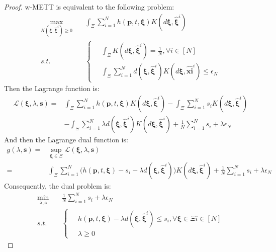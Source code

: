 \documentclass{article}
\begin{document}
\begin{proof}
	w-METT is equivalent to the following problem:
	\begin{align}
		\max_{K(\bm{\xi}, \hat{\bm{\xi}}^i) \geq 0 } \quad & \int_{\Xi} \sum_{i=1}^{N} h(\bm{p}, t, \bm{\xi}) K(d\bm{\xi}, \hat{\bm{\xi}}^i) \label{drsp-obj}\\
		s.t. \quad & \left\{
		\begin{aligned}
			\ & \int_{\Xi} K(d\bm{\xi}, \hat{\bm{\xi}}^i) = \frac{1}{N}, \forall i \in [N] \\
			& \int_{\Xi} \sum_{i=1}^{N} d(\bm{\xi}, \hat{\bm{\xi}}^i) K(d\bm{\xi}, \hat{\bm{xi}}^i) \leq \epsilon_N
		\end{aligned} \right. \label{drsp-cons}
	\end{align}
	Then the Lagrange function is:
	\begin{align}
		\mathcal{L} (\bm{\xi}, \lambda, \bm{s}) = & \int_{\Xi} \sum_{i=1}^{N} h(\bm{p}, t, \bm{\xi}) K(d\bm{\xi}, \hat{\bm{\xi}}^i)  - \int_{\Xi} \sum_{i=1}^{N} s_i K(d\bm{\xi}, \hat{\bm{\xi}}^i) \\
		& - \int_{\Xi} \sum_{i=1}^{N} \lambda d(\bm{\xi}, \hat{\bm{\xi}}^i) K(d\bm{\xi}, \hat{\bm{\xi}}^i) + \frac{1}{N} \sum_{i=1}^{N} s_i + \lambda \epsilon_N
	\end{align}
	And then the Lagrange dual function is:
	\begin{align}
		g(\lambda, \bm{s})  = & \sup_{\bm{\xi} \in \Xi} \mathcal{L}(\bm{\xi}, \lambda, \bm{s}) \\
		 = & \int_{\Xi} \sum_{i=1}^{N} \Big ( h(\bm{p}, t, \bm{\xi}) - s_i - \lambda d(\bm{\xi}, \hat{\bm{\xi}}^i) \Big ) K(d\bm{\xi}, \hat{\bm{\xi}}^i) + \frac{1}{N} \sum_{i=1}^{N} s_i + \lambda \epsilon_N
	\end{align}
	Consequently, the dual problem is:
	\begin{align}
		\min_{\lambda, \bm{s}} \quad & \frac{1}{N} \sum_{i=1}^{N} s_i + \lambda \epsilon_N \\
		s.t. \quad & \left\{
		\begin{aligned}
			\ & h(\bm{p}, t, \bm{\xi}) - \lambda d(\bm{\xi}, \hat{\bm{\xi}}^i) \leq s_i, \forall \bm{\xi} \in \Xi i \in [N] \\
			& \lambda \geq 0
		\end{aligned}\right. 
	\end{align}


\end{proof}
\end{document}
